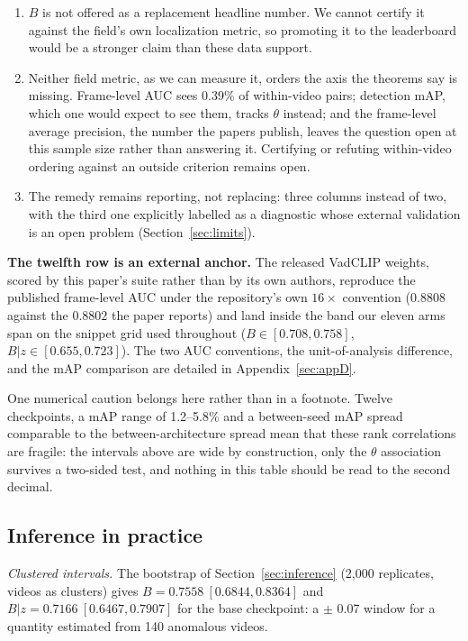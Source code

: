 \documentclass[number,preprint,12pt]{elsarticle}
\providecommand{\tightlist}{\setlength{\itemsep}{0pt}\setlength{\parskip}{0pt}}
\begin{document}
\begin{enumerate}
\def\labelenumi{\arabic{enumi}.}
\tightlist
\item
  \(B\) is not offered as a replacement headline number. We cannot certify it
  against the field's own localization metric, so promoting it to the
  leaderboard would be a stronger claim than these data support.
\item
  Neither field metric, as we can measure it, orders the axis the theorems say
  is missing.
  Frame-level AUC sees 0.39\% of within-video pairs; detection mAP, which one
  would expect to see them, tracks \(\theta\) instead; and the frame-level
  average precision, the number the papers publish, leaves the question open at
  this sample size rather than answering it. Certifying or refuting
  within-video ordering against an outside criterion remains open.
\item
  The remedy remains reporting, not replacing: three columns instead of two,
  with the third one explicitly labelled as a diagnostic whose external
  validation is an open problem (Section~\ref{sec:limits}).
\end{enumerate}

\textbf{The twelfth row is an external anchor.} The released VadCLIP weights, scored
by this paper's suite rather than by its own authors, reproduce the published
frame-level AUC under the repository's own \(16\times\) convention (\(0.8808\)
against the \(0.8802\) the paper reports) and land inside the band our eleven
arms span on the snippet grid used throughout (\(B\in[0.708,0.758]\),
\(B|z\in[0.655,0.723]\)). The two AUC conventions, the unit-of-analysis
difference, and the mAP comparison are detailed in Appendix~\ref{sec:appD}.

One numerical caution belongs here rather than in a footnote. Twelve
checkpoints, a mAP range of 1.2--5.8\% and a between-seed mAP spread comparable
to the between-architecture spread mean that these rank correlations are
fragile: the intervals above are wide by construction, only the \(\theta\)
association survives a two-sided test, and nothing in this table should be read
to the second decimal.

\subsection{Inference in practice}\label{sec:infer-practice}

\emph{Clustered intervals.} The bootstrap of Section~\ref{sec:inference} (2,000 replicates, videos as
clusters) gives \(B=0.7558\ [0.6844,0.8364]\) and \(B|z=0.7166\ [0.6467,0.7907]\)
for the base checkpoint: a \(\pm\) 0.07 window for a quantity estimated from 140
anomalous videos.
\end{document}
